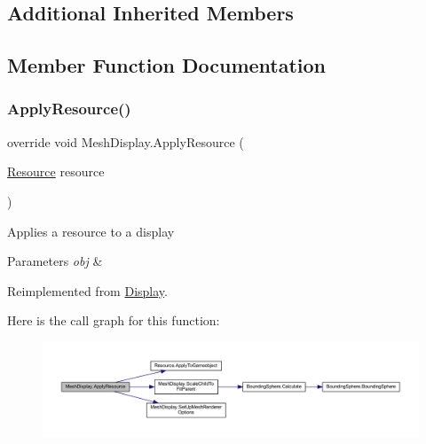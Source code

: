 \subsection*{Additional Inherited Members}


\subsection{Member Function Documentation}
\mbox{\label{class_mesh_display_aff3b19b74dd530fdf299b4feee319691}} 
\subsubsection{\texorpdfstring{Apply\+Resource()}{ApplyResource()}}
{\footnotesize\ttfamily override void Mesh\+Display.\+Apply\+Resource (\begin{DoxyParamCaption}\item[{\mbox{\hyperlink{class_resource}{Resource}}}]{resource }\end{DoxyParamCaption})\hspace{0.3cm}{\ttfamily [virtual]}}



Applies a resource to a display 


\begin{DoxyParams}{Parameters}
{\em obj} & \\
\hline
\end{DoxyParams}


Reimplemented from \mbox{\hyperlink{class_display_aa1d23e0e870c59c63e2f040e84ef0121}{Display}}.

Here is the call graph for this function\+:
\nopagebreak
\begin{figure}[H]
\begin{center}
\leavevmode
\includegraphics[width=350pt]{class_mesh_display_aff3b19b74dd530fdf299b4feee319691_cgraph}
\end{center}
\end{figure}
\mbox{\label{class_mesh_display_a13c3b8325ff12c302510a38ead46aba3}} 
